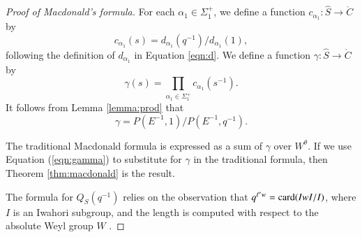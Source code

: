 \begin{proof}[Proof of Macdonald's formula]
For each $\alpha_1\in\Sigma^+_1$, we define
 a function $c_{\alpha_1}:\hat S\to\ring{C}$ by
\[
c_{\alpha_1}(s) = d_{\alpha_1}(q^{-1})/d_{\alpha_1}(1),
\]
following the definition of $d_{\alpha_1}$ in Equation \ref{eqn:d}.
We define a function $\gamma:\hat S\to \ring{C}$ by
\[
\gamma(s)  = \prod_{\alpha_1\in \Sigma^+_1} c_{\alpha_1}(s^{-1}).
\]
It follows from Lemma \ref{lemma:prod} that
\begin{equation}\label{eqn:gamma}
\gamma = P(E^{-1},1)/P(E^{-1},q^{-1}).
\end{equation}

The traditional Macdonald formula is expressed as a sum of $\gamma$ over $W^\theta$.
If we use Equation (\ref{eqn:gamma}) to substitute for $\gamma$ in the traditional formula,
then Theorem \ref{thm:macdonald} is the result.

The formula for $Q_S(q^{-1})$ relies on the observation that $q^{\ell' w} = {\operatorname{card}}(IwI/I)$, where $I$
is an Iwahori subgroup, and the length is computed with respect to the absolute Weyl group $W$ \cite[p.74]{carter1985finite}.
\end{proof}

